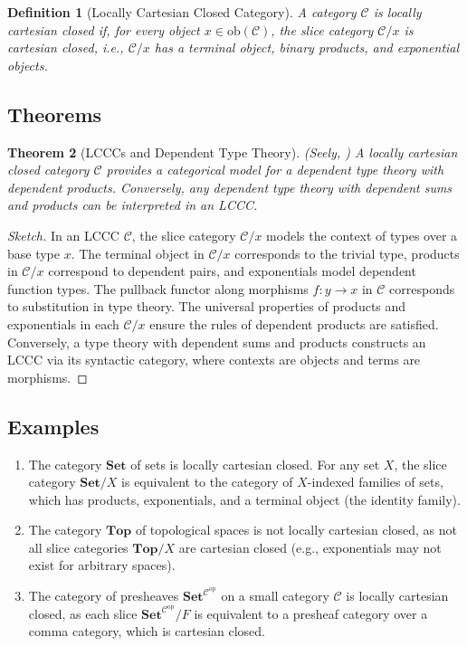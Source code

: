 \documentclass{article}
\theoremstyle{plain}
\newtheorem{theorem}{Theorem}[section]
\newtheorem{definition}[theorem]{Definition}
\theoremstyle{remark}
\begin{document}
\begin{definition}[Locally Cartesian Closed Category]
A category $\mathcal{C}$ is \emph{locally cartesian closed} if, for every object $x \in \mathrm{ob}(\mathcal{C})$, the slice category $\mathcal{C}/x$ is cartesian closed, i.e., $\mathcal{C}/x$ has a terminal object, binary products, and exponential objects.
\end{definition}

\subsection{Theorems}

\begin{theorem}[LCCCs and Dependent Type Theory]
\label{thm:lccc-type-theory}
(Seely, \cite{Seely87}) A locally cartesian closed category $\mathcal{C}$ provides a categorical model for a dependent type theory with dependent products. Conversely, any dependent type theory with dependent sums and products can be interpreted in an LCCC.
\end{theorem}

\begin{proof}[Sketch]
In an LCCC $\mathcal{C}$, the slice category $\mathcal{C}/x$ models the context of types over a base type $x$. The terminal object in $\mathcal{C}/x$ corresponds to the trivial type, products in $\mathcal{C}/x$ correspond to dependent pairs, and exponentials model dependent function types. The pullback functor along morphisms $f : y \to x$ in $\mathcal{C}$ corresponds to substitution in type theory. The universal properties of products and exponentials in each $\mathcal{C}/x$ ensure the rules of dependent products are satisfied. Conversely, a type theory with dependent sums and products constructs an LCCC via its syntactic category, where contexts are objects and terms are morphisms.
\end{proof}


\subsection{Examples}

\begin{enumerate}
    \item The category $\mathbf{Set}$ of sets is locally cartesian closed. For any set $X$, the slice category $\mathbf{Set}/X$ is equivalent to the category of $X$-indexed families of sets, which has products, exponentials, and a terminal object (the identity family).
    \item The category $\mathbf{Top}$ of topological spaces is not locally cartesian closed, as not all slice categories $\mathbf{Top}/X$ are cartesian closed (e.g., exponentials may not exist for arbitrary spaces).
    \item The category of presheaves $\mathbf{Set}^{\mathcal{C}^{\mathrm{op}}}$ on a small category $\mathcal{C}$ is locally cartesian closed, as each slice $\mathbf{Set}^{\mathcal{C}^{\mathrm{op}}}/F$ is equivalent to a presheaf category over a comma category, which is cartesian closed.
\end{enumerate}
\end{document}
